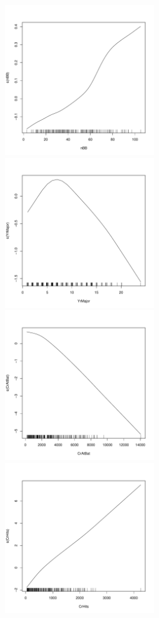 \documentclass{article}\usepackage[]{graphicx}\usepackage[]{color}
\newenvironment{knitrout}{}{} %
\begin{document}
\begin{knitrout}
\includegraphics[width=0.50\textwidth]{figure/unnamed-chunk-3-5} 
\includegraphics[width=0.50\textwidth]{figure/unnamed-chunk-3-6} 
\includegraphics[width=0.50\textwidth]{figure/unnamed-chunk-3-7} 
\includegraphics[width=0.50\textwidth]{figure/unnamed-chunk-3-8} 

\end{knitrout}
\end{document}
